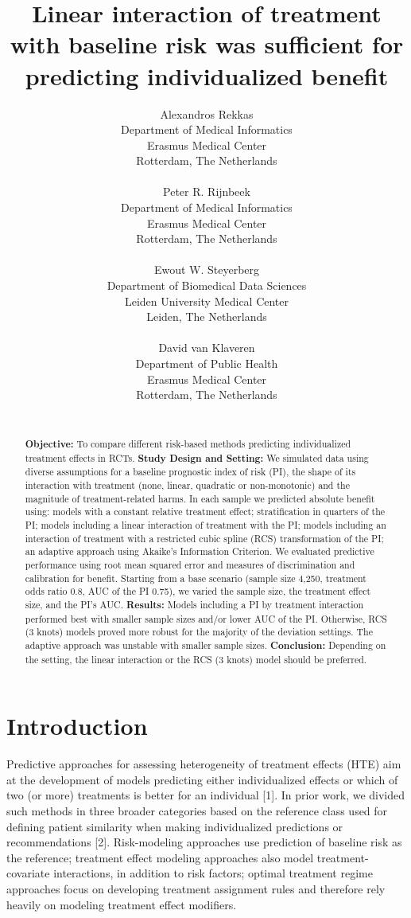 \documentclass{article}
\title{Linear interaction of treatment with baseline risk was sufficient
for predicting individualized benefit}
\author{
    Alexandros Rekkas
   \\
    Department of Medical Informatics \\
    Erasmus Medical Center \\
  Rotterdam, The Netherlands \\
  \texttt{} \\
   \And
    Peter R. Rijnbeek
   \\
    Department of Medical Informatics \\
    Erasmus Medical Center \\
  Rotterdam, The Netherlands \\
  \texttt{} \\
   \And
    Ewout W. Steyerberg
   \\
    Department of Biomedical Data Sciences \\
    Leiden University Medical Center \\
  Leiden, The Netherlands \\
  \texttt{} \\
   \And
    David van Klaveren
   \\
    Department of Public Health \\
    Erasmus Medical Center \\
  Rotterdam, The Netherlands \\
  \texttt{} \\
  }
\date{}
\begin{document}
\maketitle

\def\tightlist{}


\begin{abstract}
\textbf{Objective:} To compare different risk-based methods predicting
individualized treatment effects in RCTs. \textbf{Study Design and
Setting:} We simulated data using diverse assumptions for a baseline
prognostic index of risk (PI), the shape of its interaction with
treatment (none, linear, quadratic or non-monotonic) and the magnitude
of treatment-related harms. In each sample we predicted absolute benefit
using: models with a constant relative treatment effect; stratification
in quarters of the PI; models including a linear interaction of
treatment with the PI; models including an interaction of treatment with
a restricted cubic spline (RCS) transformation of the PI; an adaptive
approach using Akaike's Information Criterion. We evaluated predictive
performance using root mean squared error and measures of discrimination
and calibration for benefit. Starting from a base scenario (sample size
4,250, treatment odds ratio 0.8, AUC of the PI 0.75), we varied the
sample size, the treatment effect size, and the PI's AUC.
\textbf{Results:} Models including a PI by treatment interaction
performed best with smaller sample sizes and/or lower AUC of the PI.
Otherwise, RCS (3 knots) models proved more robust for the majority of
the deviation settings. The adaptive approach was unstable with smaller
sample sizes. \textbf{Conclusion:} Depending on the setting, the linear
interaction or the RCS (3 knots) model should be preferred.
\end{abstract}


\doublespacing 
\linenumbers

\hypertarget{introduction}{%
\section{Introduction}\label{introduction}}

Predictive approaches for assessing heterogeneity of treatment effects
(HTE) aim at the development of models predicting either individualized
effects or which of two (or more) treatments is better for an individual
{[}1{]}. In prior work, we divided such methods in three broader
categories based on the reference class used for defining patient
similarity when making individualized predictions or recommendations
{[}2{]}. Risk-modeling approaches use prediction of baseline risk as the
reference; treatment effect modeling approaches also model
treatment-covariate interactions, in addition to risk factors; optimal
treatment regime approaches focus on developing treatment assignment
rules and therefore rely heavily on modeling treatment effect modifiers.
\end{document}
